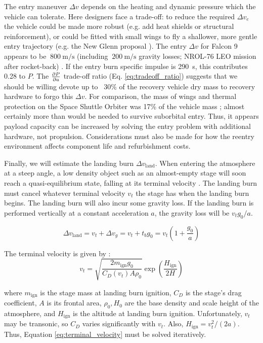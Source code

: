 \documentclass[conf]{new-aiaa}
\begin{document}
The entry maneuver $\Delta v$ depends on the heating and dynamic pressure which the vehicle can tolerate. Here designers face a trade-off: to reduce the required $\Delta v_e$ the vehicle could be made more robust (e.g. add heat shields or structural reinforcement), or could be fitted with small wings to fly a shallower, more gentle entry trajectory (e.g. the New Glenn proposal \cite{NewGlenn}). The entry $\Delta v$ for Falcon 9 appears to be $~\SI{800}{\meter\per\second}$ (including $~\SI{200}{\meter\per\second}$ gravity losses; NROL-76 LEO mission after rocket-back) \cite{Dumont2017}\cite{SpaceXWebcast}. If the entry burn specific impulse is \SI{290}{\second}, this contributes 0.28 to $P$. The $\pdv{P}{a}$ trade-off ratio (Eq. \ref{eq:tradeoff_ratio}) suggests that we should be willing devote up to ~30\% of the recovery vehicle dry mass to recovery hardware to forgo this $\Delta v$. For comparison, the mass of wings and thermal protection on the Space Shuttle Orbiter was 17\% of the vehicle mass \cite{Sforza2015}; almost certainly more than would be needed to survive suborbital entry. Thus, it appears payload capacity can be increased by solving the entry problem with additional hardware, not propulsion. Considerations must also be made for how the reentry environment affects component life and refurbishment costs.

Finally, we will estimate the landing burn $\Delta v_{\mathrm{land}}$. When entering the atmosphere at a steep angle, a low density object such as an almost-empty stage will soon reach a quasi-equilibrium state, falling at its terminal velocity \cite{Wiesel2010}. The landing burn must cancel whatever terminal velocity $v_t$ the stage has when the landing burn begins. The landing burn will also incur some gravity loss. If the landing burn is performed vertically at a constant acceleration $a$, the gravity loss will be $v_t g_0 / a$.

\begin{equation}
\Delta v_{\mathrm{land}} = v_t + \Delta v_{g} = v_t + t_b g_0 = v_t(1 + \frac{g_0}{a})
\end{equation}

The terminal velocity is given by \cite{Wiesel2010}:
\begin{equation}
\label{eq:terminal_velocity}
v_t = \sqrt{\frac{2 m_{\mathrm{ign}} g_0}{C_D(v_t) A \rho_{0}}} \exp\left( \frac{H_\mathrm{ign}}{2H} \right)
\end{equation}

where $m_{\mathrm{ign}}$ is the stage mass at landing burn ignition, $C_D$ is the stage's drag coefficient, $A$ is its frontal area, $\rho_0, H_0$ are the base density and scale height of the atmosphere, and $H_\mathrm{ign}$ is the altitude at landing burn ignition. Unfortunately, $v_t$ may be transonic, so $C_D$ varies significantly with $v_t$. Also, $H_\mathrm{ign} = v_t^2 / (2 a)$.  Thus, Equation \ref{eq:terminal_velocity} must be solved iteratively.
\end{document}
